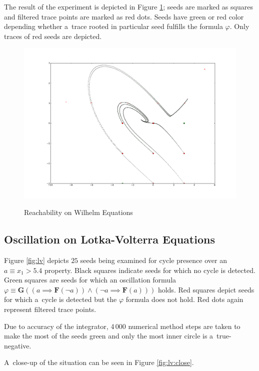\documentclass[12pt,twoside,draft]{fithesis}
\newcommand{\bF}{\mathbf{F}}
\newcommand{\bG}{\mathbf{G}}
\begin{document}
The result of the experiment is depicted in Figure \ref{fig:wh};
seeds are marked as squares and filtered trace points are marked
as red dots. Seeds have green or red color depending whether
a~trace rooted in particular seed fulfills the formula $\varphi$.
Only traces of red seeds are depicted.
\begin{figure}[h]
\center
\includegraphics[scale=0.31,draft=false]{wh_reachability}
\label{fig:wh}
\caption{Reachability on Wilhelm Equations}
\end{figure}

\subsection*{Oscillation on Lotka-Volterra Equations}
Figure \ref{fig:lv} depicts $25$ seeds being examined for cycle presence
over an~$a\equiv x_1>5.4$ property. Black squares indicate seeds
for which no cycle is detected. Green squares are seeds for which
an oscillation formula
$\varphi\equiv\bG((a\implies\bF(\neg a))\wedge(\neg a\implies\bF(a)))$
holds. Red squares depict seeds for which a~cycle is detected but the
$\varphi$ formula does not hold. Red dots again represent filtered trace
points.

Due to accuracy of the integrator, 4\,000 numerical method
steps are taken to make the most of the seeds green and only the most
inner circle is a~true-negative. 

A~close-up of the situation can be seen in Figure \ref{fig:lv:close}.
\end{document}
